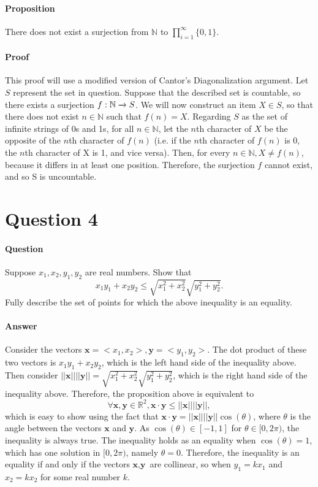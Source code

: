 \documentclass{article}
\begin{document}
\paragraph{Proposition} There does not exist a surjection from $\mathbb{N}$ to $\displaystyle\prod_{i=1}^{\infty}\{0,1\}$.
\vspace{-10pt}
\paragraph{Proof} This proof will use a modified version of Cantor's Diagonalization argument. Let $S$ represent the set in question. Suppose that the described set is countable, so there exists a surjection  $f:\mathbb{N}\xrightarrow{}{S}$. We will now construct an item $X\in S$, so that there does not exist $n\in \mathbb{N}$ such that $f(n)=X$. Regarding $S$ as the set of infinite strings of 0s and 1s, for all $n \in \mathbb{N}$, let the $n$th character of $X$ be the opposite of the $n$th character of $f(n)$ (i.e. if the $n$th character of $f(n)$ is 0, the $n$th character of X is 1, and vice versa). Then, for every $n \in \mathbb{N}, X \neq f(n)$, because it differs in at least one position. Therefore, the surjection $f$ cannot exist, and so S is uncountable. 
\pagebreak
\section{Question 4}
\paragraph{Question} Suppose $x_1,x_2,y_1,y_2$ are real numbers. Show that
\begin{equation*}
    x_1y_1 + x_2y_2 \leq \sqrt{x_1^2+x_2^2}\sqrt{y_1^2+y_2^2}.
\end{equation*}
\noindent Fully describe the set of points for which the above inequality is an equality.
\paragraph{Answer} Consider the vectors $\textbf{x}=<x_1, x_2>, \textbf{y} = <y_1, y_2>$. The dot product of these two vectors is $x_1y_1 + x_2y_2$, which is the left hand side of the inequality above. Then consider $||\textbf{x}||||\textbf{y}|| = \sqrt{x_1^2+x_2^2}\sqrt{y_1^2+y_2^2}$, which is the right hand side of the inequality above. Therefore, the proposition above is equivalent to
\begin{equation*}
	\forall \textbf{x},\textbf{y} \in \mathbb{R}^2, \textbf{x}\cdot\textbf{y} \leq ||\textbf{x}||||\textbf{y}||,
\end{equation*}
\noindent which is easy to show using the fact that $\textbf{x}\cdot\textbf{y} = ||\textbf{x}||||\textbf{y}||\cos(\theta)$, where $\theta$ is the angle between the vectors $\textbf{x}$ and $\textbf{y}$. As $\cos(\theta) \in [-1,1]$ for $\theta \in [0, 2\pi)$, the inequality is always true.\newline
The inequality holds as an equality when $\cos(\theta) = 1$, which has one solution in $[0,2\pi)$, namely $\theta = 0$. Therefore, the inequality is an equality if and only if the vectors $\textbf{x}, \textbf{y}$ are collinear, so when $y_1 = kx_1$ and $x_2 = kx_2$ for some real number $k$.
\pagebreak
\end{document}
